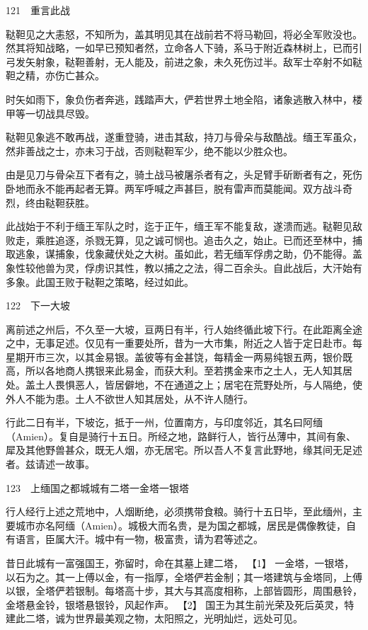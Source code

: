 \documentclass[12pt,UTF8]{ctexbook}
\begin{document}
121　重言此战

鞑靼见之大恚怒，不知所为，盖其明见其在战前若不将马勒回，将必全军败没也。然其将知战略，一如早已预知者然，立命各人下骑，系马于附近森林树上，已而引弓发矢射象，鞑靼善射，无人能及，前进之象，未久死伤过半。敌军士卒射不如鞑靼之精，亦伤亡甚众。

时矢如雨下，象负伤者奔逃，践踏声大，俨若世界土地全陷，诸象逃散入林中，楼甲等一切战具尽毁。

鞑靼见象逃不敢再战，遂重登骑，进击其敌，持刀与骨朵与敌酷战。缅王军虽众，然非善战之士，亦未习于战，否则鞑靼军少，绝不能以少胜众也。

由是见刀与骨朵互下者有之，骑土战马被屠杀者有之，头足臂手斫断者有之，死伤卧地而永不能再起者无算。两军呼喊之声甚巨，脱有雷声而莫能闻。双方战斗奇烈，终由鞑靼获胜。

此战始于不利于缅王军队之时，迄于正午，缅王军不能复敌，遂溃而逃。鞑靼见敌败走，乘胜追逐，杀戮无算，见之诚可悯也。追击久之，始止。已而还至林中，捕取逃象，谋捕象，伐象藏伏处之大树。虽如此，若无缅军俘虏之助，仍不能得。盖象性较他兽为灵，俘虏识其性，教以捕之之法，得二百余头。自此战后，大汗始有多象。此国王败于鞑靼之策略，经过如此。





122　下一大坡

离前述之州后，不久至一大坡，亘两日有半，行人始终循此坡下行。在此距离全途之中，无事足述。仅见有一重要处所，昔为一大市集，附近之人皆于定日赴市。每星期开市三次，以其金易银。盖彼等有金甚饶，每精金一两易纯银五两，银价既高，所以各地商人携银来此易金，而获大利。至若携金来市之土人，无人知其居处。盖土人畏惧恶人，皆居僻地，不在通道之上；居宅在荒野处所，与人隔绝，使外人不能为患。土人不欲世人知其居处，从不许人随行。

行此二日有半，下坡讫，抵于一州，位置南方，与印度邻近，其名曰阿缅（Amien）。复自是骑行十五日。所经之地，路鲜行人，皆行丛薄中，其间有象、犀及其他野兽甚众，既无人烟，亦无居宅。所以吾人不复言此野地，缘其间无足述者。兹请述一故事。





123　上缅国之都城城有二塔一金塔一银塔

行人经行上述之荒地中，人烟断绝，必须携带食粮。骑行十五日毕，至此缅州，主要城市亦名阿缅（Amien）。城极大而名贵，是为国之都城，居民是偶像教徒，自有语言，臣属大汗。城中有一物，极富贵，请为君等述之。

昔日此城有一富强国王，弥留时，命在其墓上建二塔， 【1】 一金塔，一银塔，以石为之。其一上傅以金，有一指厚，全塔俨若金制；其一塔建筑与金塔同，上傅以银，全塔俨若银制。每塔高十步，其大与其高度相称，上部皆圆形，周围悬铃，金塔悬金铃，银塔悬银铃，风起作声。 【2】 国王为其生前光荣及死后英灵，特建此二塔，诚为世界最美观之物，太阳照之，光明灿烂，远处可见。
\end{document}
